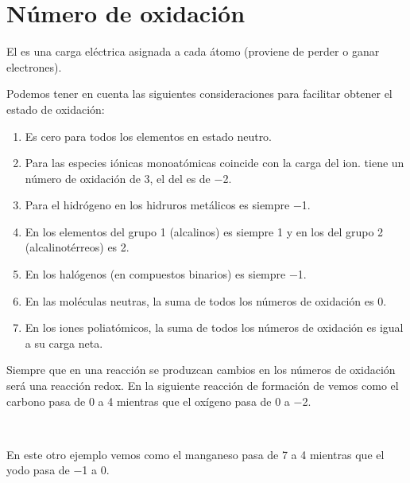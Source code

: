 \vspace*{24pt}
\section{Número de oxidación}\label{subsec:numero-de-oxidacion}

\begin{center}
    \begin{definition}
        El  es una carga eléctrica asignada a cada átomo (proviene de perder o ganar electrones).
    \end{definition}
\end{center}


Podemos tener en cuenta las siguientes consideraciones para facilitar obtener el estado de oxidación:

\begin{enumerate}[label=\numberballmDarkTeal]
        \item Es cero para todos los elementos en estado neutro.
        \item Para las especies iónicas monoatómicas coincide con la carga del ion.  tiene un número de oxidación de \num{+3}, el del  es de \num{-2}.
        \item Para el hidrógeno en los hidruros metálicos es siempre \num{-1}.
        \item En los elementos del grupo 1 (alcalinos) es siempre \num{+1} y en los del grupo 2 (alcalinotérreos) es \num{+2}.
        \item En los halógenos (en compuestos binarios) es siempre \num{-1}.
        \item En las moléculas neutras, la suma de todos los números de oxidación es \num{0}.
        \item En los iones poliatómicos, la suma de todos los números de oxidación es igual a su carga neta.
\end{enumerate}

Siempre que en una reacción se produzcan cambios en los números de oxidación será una reacción redox.
En la siguiente reacción de formación de  vemos como el carbono pasa de \num{0} a \num{+4} mientras que el oxígeno pasa de \num{0} a \num{-2}.

\begin{centeredequation}
     \ch{+}  \ch{->} \ 
\end{centeredequation}

En este otro ejemplo vemos como el manganeso pasa de \num{+7} a \num{+4} mientras que el yodo pasa de \num{-1} a \num{0}.

